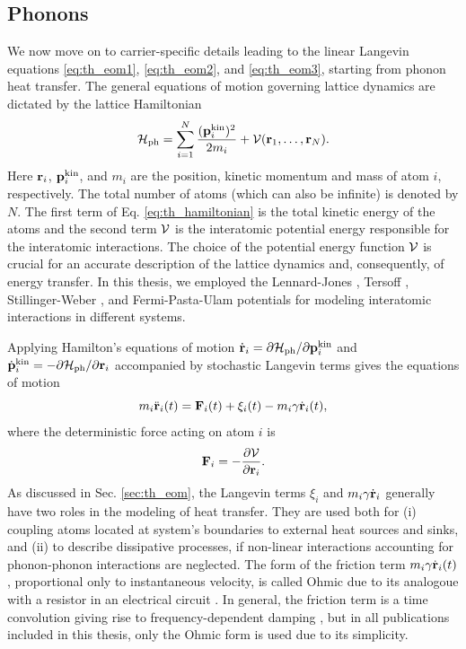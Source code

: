 \subsection{Phonons}

\label{sec:th_eom2_phonon}

We now move on to carrier-specific details leading to the linear Langevin equations \eqref{eq:th_eom1}, \eqref{eq:th_eom2}, and \eqref{eq:th_eom3}, starting from phonon heat transfer. The general equations of motion governing lattice dynamics are dictated by the lattice Hamiltonian \cite{ziman}
\begin{equation}
 \mathcal{H}_{\textrm{ph}} = \sum_{i=1}^N \frac{(\mathbf{p}^{\textrm{kin}}_i)^2}{2m_i} + \mathcal{V}(\mathbf{r}_1,\dots,\mathbf{r}_N). \label{eq:th_hamiltonian}
\end{equation}
Here $\mathbf{r}_i$, $\mathbf{p}^{\textrm{kin}}_i$, and $m_i$ are the position, kinetic momentum and mass of atom $i$, respectively. The total number of atoms (which can also be infinite) is denoted by $N$. The first term of Eq. \eqref{eq:th_hamiltonian} is the total kinetic energy of the atoms and the second term $\mathcal{V}$ is the interatomic potential energy responsible for the interatomic interactions. The choice of the potential energy function $\mathcal{V}$ is crucial for an accurate description of the lattice dynamics and, consequently, of energy transfer. In this thesis, we employed the Lennard-Jones \cite{allentildesley}, Tersoff \cite{tersoff88a}, Stillinger-Weber \cite{stillinger85}, and Fermi-Pasta-Ulam \cite{fermi55} potentials for modeling interatomic interactions in different systems.  

Applying Hamilton's equations of motion $\dot{\mathbf{r}}_i=\partial \mathcal{H}_{\textrm{ph}}/\partial \mathbf{p}_i^{\textrm{kin}}$ and $\dot{\mathbf{p}}_i^{\textrm{kin}}=-\partial \mathcal{H}_{\textrm{ph}}/\partial \mathbf{r}_i$ \cite{fetter} accompanied by stochastic Langevin terms \cite{dhar06} gives the equations of motion
\begin{equation}
 m_i \ddot{\mathbf{r}}_i(t) = \mathbf{F}_i(t) + \xi_i(t) - m_i \gamma \dot{\mathbf{r}}_i(t), \label{eq:th_eom}
\end{equation}
where the deterministic force acting on atom $i$ is
\begin{equation}
 \mathbf{F}_i = - \frac{\partial \mathcal{V}}{\partial \mathbf{r}_i}. \label{eq:th_force}
\end{equation}
As discussed in Sec. \ref{sec:th_eom}, the Langevin terms $\xi_i$ and $m_i\gamma \dot{\mathbf{r}}_i$ generally have two roles in the modeling of heat transfer. They are used both for (i) coupling atoms located at system's boundaries to external heat sources and sinks,  and (ii) to describe dissipative processes, if non-linear interactions accounting for phonon-phonon interactions are neglected. The form of the friction term $m_i \gamma \dot{\mathbf{r}}_i(t)$, proportional only to instantaneous velocity, is called Ohmic due to its analogoue with a resistor in an electrical circuit \cite{weiss}. In general, the friction term is a time convolution giving rise to frequency-dependent damping \cite{weiss}, but in all publications included in this thesis, only the Ohmic form is used due to its simplicity.
 
